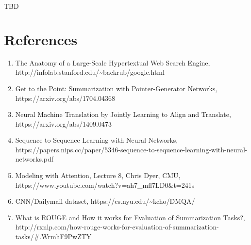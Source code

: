 \documentclass[11pt]{article}
\providecommand{\tightlist}{%
      \setlength{\itemsep}{0pt}\setlength{\parskip}{0pt}}
\begin{document}
TBD

    \section{References}\label{references}

    \begin{enumerate}
\def\labelenumi{\arabic{enumi}.}
\tightlist
\item
  The Anatomy of a Large-Scale Hypertextual Web Search Engine,
  http://infolab.stanford.edu/\textasciitilde{}backrub/google.html
\item
  Get to the Point: Summarization with Pointer-Generator Networks,
  https://arxiv.org/abs/1704.04368
\item
  Neural Machine Translation by Jointly Learning to Align and Translate,
  https://arxiv.org/abs/1409.0473
\item
  Sequence to Sequence Learning with Neural Networks,
  https://papers.nips.cc/paper/5346-sequence-to-sequence-learning-with-neural-networks.pdf
\item
  Modeling with Attention, Lecture 8, Chris Dyer, CMU,
  https://www.youtube.com/watch?v=ah7\_mfl7LD0\&t=241s
\item
  CNN/Dailymail dataset, https://cs.nyu.edu/\textasciitilde{}kcho/DMQA/
\item
  What is ROUGE and How it works for Evaluation of Summarization Tasks?,
  http://rxnlp.com/how-rouge-works-for-evaluation-of-summarization-tasks/\#.WrmhF9PwZTY
\end{enumerate}


    
    
    
    
\end{document}

